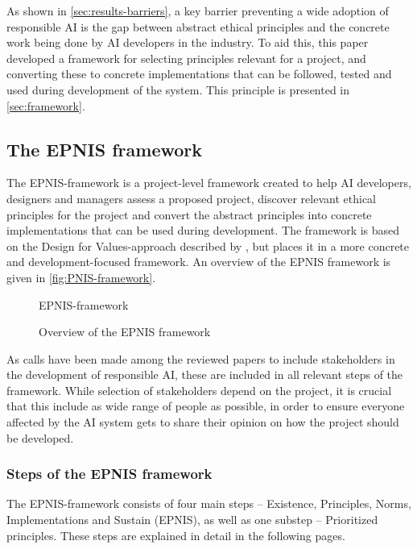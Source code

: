 As shown in \autoref{sec:results-barriers}, a key barrier preventing a wide adoption of responsible AI is the gap between abstract ethical principles and the concrete work being done by AI developers in the industry. To aid this, this paper developed a framework for selecting principles relevant for a project, and converting these to concrete implementations that can be followed, tested and used during development of the system. This principle is presented in \autoref{sec:framework}.


\subsection{The EPNIS framework}
\label{sec:framework}
The EPNIS-framework is a project-level framework created to help AI developers, designers and managers assess a proposed project, discover relevant ethical principles for the project and convert the abstract principles into concrete implementations that can be used during development. The framework is based on the Design for Values-approach described by \textcite{Dignum_2019}, but places it in a more concrete and development-focused framework. An overview of the EPNIS framework is given in \autoref{fig:PNIS-framework}.

\begin{figure}[htp]
    \centering
    {EPNIS-framework}
    \caption{Overview of the EPNIS framework}
    \label{fig:PNIS-framework}
\end{figure}

As calls have been made among the reviewed papers to include stakeholders in the development of responsible AI, these are included in all relevant steps of the framework. While selection of stakeholders depend on the project, it is crucial that this include as wide range of people as possible, in order to ensure everyone affected by the AI system gets to share their opinion on how the project should be developed.

\subsubsection{Steps of the EPNIS framework}
The EPNIS-framework consists of four main steps -- Existence, Principles, Norms, Implementations and Sustain (EPNIS), as well as one substep -- Prioritized principles. These steps are explained in detail in the following pages.

